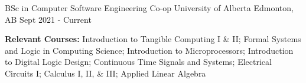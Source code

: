 

\begin{cventries}

  \cventry
    {BSc in Computer Software Engineering Co-op} %
    {University of Alberta} %
    {Edmonton, AB} %
    {Sept 2021 - Current} %
    {
      \begin{cvitems} %
        \item {\textbf{Relevant Courses:} Introduction to Tangible Computing I \& II; Formal Systems and Logic in Computing Science; Introduction to Microprocessors; Introduction to Digital Logic Design; Continuous Time Signals and Systems; Electrical Circuits I; Calculus I, II, \& III; Applied Linear Algebra}
      \end{cvitems}
    }
 
\end{cventries}
